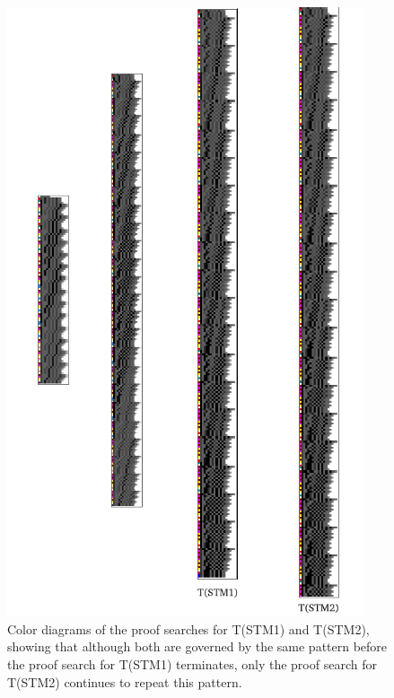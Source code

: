 \documentclass[%
  manuscript=article,   %
  year=2024,
  volume=77,
  doi=00000.000,
]{zfn}
\begin{document}
\begin{figure}
    \centering
    \includegraphics[width=10.5cm]{ART_Lampert/STM12tableauxtotal.png}
\caption{Color diagrams of the proof searches for T(STM1) and T(STM2),
showing that although both are governed by the same pattern before the proof search for T(STM1) terminates, only the proof search for T(STM2) continues to repeat this pattern.}
    \label{STM12skolem}
\end{figure}
\end{document}
